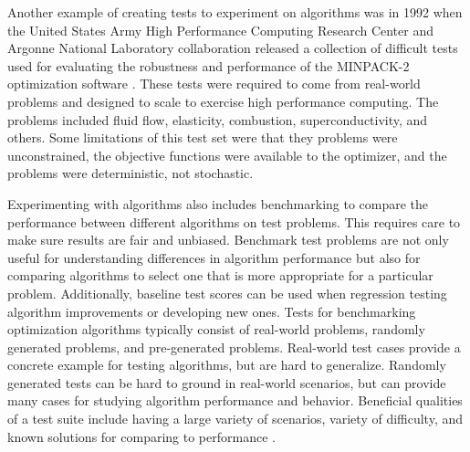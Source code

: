 \documentclass[a4paper]{article}
\begin{document}
Another example of creating tests to experiment on algorithms was in 1992 when the United States Army High Performance Computing Research Center and Argonne National Laboratory collaboration released a collection of difficult tests used for evaluating the robustness and performance of the MINPACK-2 optimization software  \cite{averick_minpack-2_1992}. These tests were required to come from real-world problems and designed to scale to exercise high performance computing. The problems included fluid flow, elasticity, combustion, superconductivity, and others. Some limitations of this test set were that they problems were unconstrained, the objective functions were available to the optimizer, and the problems were deterministic, not stochastic.

Experimenting with algorithms also includes benchmarking to compare the performance between different algorithms on test problems. This requires care to make sure results are fair and unbiased. Benchmark test problems are not only useful for understanding differences in algorithm performance but also for comparing algorithms to select one that is more appropriate for a particular problem. Additionally, baseline test scores can be used when regression testing algorithm improvements or developing new ones. Tests for benchmarking optimization algorithms typically consist of real-world problems, randomly generated problems, and pre-generated problems. Real-world test cases provide a concrete example for testing algorithms, but are hard to generalize. Randomly generated tests can be hard to ground in real-world scenarios, but can provide many cases for studying algorithm performance and behavior. Beneficial qualities of a test suite include having a large variety of scenarios, variety of difficulty, and known solutions for comparing to performance \cite{beiranvand_best_2017}.
\end{document}
